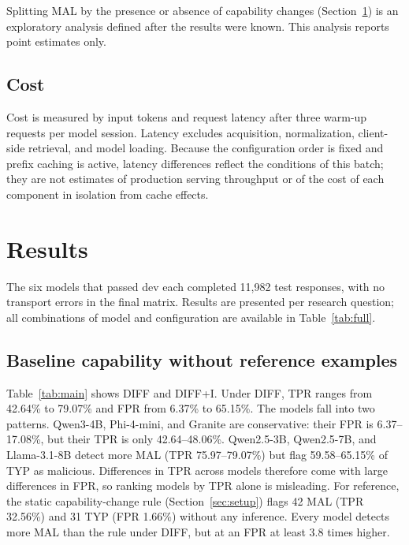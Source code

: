 \documentclass[a4paper,fleqn]{cas-dc}
\begin{document}
Splitting MAL by the presence or absence of capability changes
(Section~\ref{sec:results}) is an exploratory analysis defined after the results
were known. This analysis reports point estimates only.

\subsection{Cost}
Cost is measured by input tokens and request latency after three warm-up
requests per model session. Latency excludes acquisition, normalization,
client-side retrieval, and model loading. Because the configuration order is
fixed and prefix caching is active, latency differences reflect the conditions of
this batch; they are not estimates of production serving throughput or of the
cost of each component in isolation from cache effects.

\section{Results}\label{sec:results}
The six models that passed dev each completed 11,982 test responses, with no
transport errors in the final matrix. Results are presented per research
question; all combinations of model and configuration are available in
Table~\ref{tab:full}.

\subsection{Baseline capability without reference examples}
Table~\ref{tab:main} shows DIFF and DIFF+I. Under DIFF, TPR ranges from
42.64\% to 79.07\% and FPR from 6.37\% to 65.15\%. The models fall into two
patterns. Qwen3-4B, Phi-4-mini, and Granite are conservative: their FPR is
6.37--17.08\%, but their TPR is only 42.64--48.06\%. Qwen2.5-3B, Qwen2.5-7B, and
Llama-3.1-8B detect more MAL (TPR 75.97--79.07\%) but flag 59.58--65.15\% of TYP
as malicious. Differences in TPR across models therefore come with large
differences in FPR, so ranking models by TPR alone is misleading. For reference,
the static capability-change rule (Section~\ref{sec:setup}) flags 42 MAL
(TPR 32.56\%) and 31 TYP (FPR 1.66\%) without any inference. Every model detects
more MAL than the rule under DIFF, but at an FPR at least 3.8 times higher.
\end{document}

